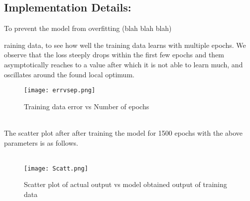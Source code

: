 \documentclass{article}
\begin{document}
\subsection{Implementation Details:}

To prevent the model from overfitting (blah blah blah)


raining data, to see how well the training data learns with multiple epochs. We observe that the loss steeply drops within the first few epochs and them asymptotically reaches to a value after which it is not able to learn much, and oscillates around the found local optimum.
\begin{figure}[htbp]
    \centering
    \texttt{[image: errvsep.png]}
    \captionsetup{justification=centering}
    \caption{Training data error vs Number of epochs}
\end{figure}
\\
The scatter plot after after training the model for 1500 epochs with the above parameters is as follows.\\
\\

\begin{figure}[htbp]
    \centering
    \texttt{[image: Scatt.png]}
    \captionsetup{justification=centering}
    \caption{Scatter plot of actual output vs model obtained output of training data}
\end{figure}
\end{document}

